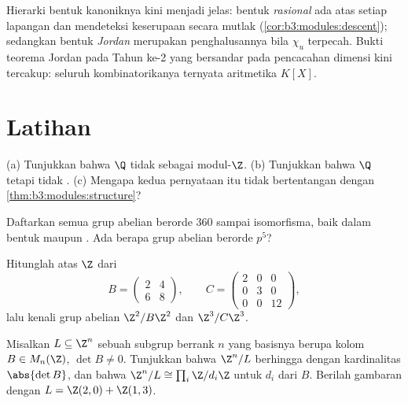 \begin{remark}\label{rem:b3:modules:overview}
Hierarki bentuk kanoniknya kini menjadi jelas:
bentuk \emph{rasional} ada atas setiap lapangan dan mendeteksi
keserupaan secara mutlak (\cref{cor:b3:modules:descent}); sedangkan
bentuk \emph{Jordan} merupakan penghalusannya bila $\chi_u$ terpecah.
Bukti teorema Jordan pada Tahun ke-2 yang bersandar pada pencacahan dimensi
kini tercakup: seluruh kombinatorikanya ternyata aritmetika 
$K[X]$.
\end{remark}

\section{Latihan}

\begin{exercise}[$\star$]\label{exo:b3:modules:1}
(a) Tunjukkan bahwa $\Q$ tidak  sebagai modul-$\Z$.
(b) Tunjukkan bahwa $\Q$   tetapi tidak .
(c) Mengapa kedua pernyataan itu tidak bertentangan dengan
\cref{thm:b3:modules:structure}?
\end{exercise}

\begin{exercise}[$\star$]\label{exo:b3:modules:2}
Daftarkan semua grup abelian berorde $360$ sampai isomorfisma, baik dalam
bentuk  maupun . Ada berapa grup abelian
berorde $p^5$?
\end{exercise}

\begin{exercise}[$\star$]\label{exo:b3:modules:3}
Hitunglah  atas $\Z$ dari
\[
B = \begin{pmatrix} 2 & 4\\ 6 & 8 \end{pmatrix},
\qquad
C = \begin{pmatrix} 2 & 0 & 0\\ 0 & 3 & 0\\ 0 & 0 & 12
\end{pmatrix},
\]
lalu kenali grup abelian $\Z^2/B\Z^2$ dan $\Z^3/C\Z^3$.
\end{exercise}

\begin{exercise}[$\star\star$]\label{exo:b3:modules:4}
Misalkan $L \subseteq \Z^n$ sebuah subgrup berrank $n$ yang basisnya berupa
kolom $B \in M_n(\Z)$, $\det B \neq 0$. Tunjukkan bahwa
$\Z^n/L$ berhingga dengan kardinalitas $\abs{\det B}$, dan bahwa $\Z^n/L
\cong \prod_i \Z/d_i\Z$ untuk  $d_i$ dari $B$.
Berilah gambaran dengan $L = \Z(2,0) + \Z(1,3)$.
\end{exercise}

